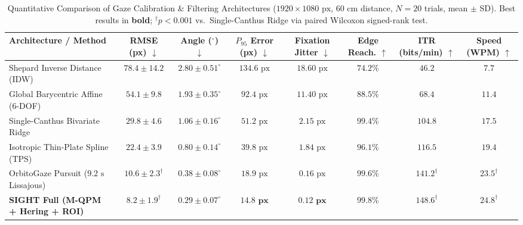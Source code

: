 \documentclass[twocolumn,10pt]{article}
\begin{document}
\begin{table}[t]
\centering
\caption{Quantitative Comparison of Gaze Calibration \& Filtering Architectures ($1920 \times 1080\text{ px}$, $60\text{ cm}$ distance, $N=20$ trials, mean $\pm$ SD). Best results in \textbf{bold}; $^\dagger p < 0.001$ vs.\ Single-Canthus Ridge via paired Wilcoxon signed-rank test.}
\label{tab:metrics}
\begin{tabular}{lccccccc}
\toprule
\textbf{Architecture / Method} & \textbf{RMSE (px)} $\downarrow$ & \textbf{Angle ($^\circ$)} $\downarrow$ & \textbf{$P_{95}$ Error (px)} $\downarrow$ & \textbf{Fixation Jitter} $\downarrow$ & \textbf{Edge Reach.} $\uparrow$ & \textbf{ITR (bits/min)} $\uparrow$ & \textbf{Speed (WPM)} $\uparrow$ \\
\midrule
Shepard Inverse Distance (IDW) & $78.4 \pm 14.2$ & $2.80 \pm 0.51^\circ$ & $134.6\text{ px}$ & $18.60\text{ px}$ & $74.2\%$ & $46.2$ & $7.7$ \\
Global Barycentric Affine (6-DOF) & $54.1 \pm 9.8$ & $1.93 \pm 0.35^\circ$ & $92.4\text{ px}$ & $11.40\text{ px}$ & $88.5\%$ & $68.4$ & $11.4$ \\
Single-Canthus Bivariate Ridge & $29.8 \pm 4.6$ & $1.06 \pm 0.16^\circ$ & $51.2\text{ px}$ & $2.15\text{ px}$ & $99.4\%$ & $104.8$ & $17.5$ \\
Isotropic Thin-Plate Spline (TPS) & $22.4 \pm 3.9$ & $0.80 \pm 0.14^\circ$ & $39.8\text{ px}$ & $1.84\text{ px}$ & $96.1\%$ & $116.5$ & $19.4$ \\
OrbitoGaze Pursuit ($9.2\text{ s}$ Lissajous) & $10.6 \pm 2.3^\dagger$ & $0.38 \pm 0.08^\circ$ & $18.9\text{ px}$ & $0.16\text{ px}$ & $99.6\%$ & $141.2^\dagger$ & $23.5^\dagger$ \\
\textbf{SIGHT Full (M-QPM + Hering + ROI)} & $\mathbf{8.2 \pm 1.9^\dagger}$ & $\mathbf{0.29 \pm 0.07^\circ}$ & $\mathbf{14.8\text{ px}}$ & $\mathbf{0.12\text{ px}}$ & $\mathbf{99.8\%}$ & $\mathbf{148.6^\dagger}$ & $\mathbf{24.8^\dagger}$ \\
\bottomrule
\end{tabular}
\end{table}
\end{document}
